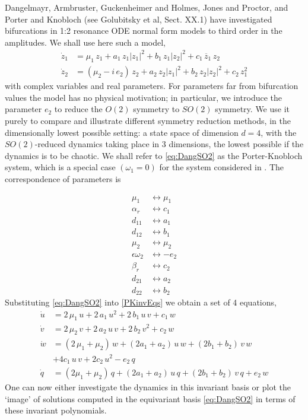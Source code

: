 \documentclass{article}
\begin{document}
Dangelmayr,\cite{Dang86} Armbruster, Guckenheimer and Holmes,\cite{AGHO288}
Jones and Proctor,\cite{JoPro87} and Porter and Knobloch\cite{PoKno05} (see
Golubitsky et al\cite{golubII}, Sect. XX.1) have investigated bifurcations
in 1:2 resonance ODE normal form models to third order in the amplitudes.
We shall use here such a model,
\begin{subequations}\label{eq:DangSO2}
\begin{align}
  \dot{z}_1 &= \mu_1\,z_1+a_1\,z_1|z_1|^2+b_1\,z_1|z_2|^2+c_1\,\overline{z}_1\,z_2\,\\
  \dot{z}_2 &= (\mu_2-i\, e_2)\,{z_2}+a_2\,z_2|z_1|^2+b_2\,z_2|z_2|^2+c_2\,z_1^2
\end{align}
\end{subequations}
with complex variables and real parameters. For parameters far from
bifurcation values the model has no physical motivation; in particular,
we introduce the parameter $e_2$ to reduce the $O(2)$ symmetry to $SO(2)$
symmetry. We use it purely to compare and illustrate different symmetry
reduction methods, in the dimensionally lowest possible setting: a state
space of dimension $d=4$, with the $SO(2)$-reduced dynamics taking place
in 3 dimensions, the lowest possible if the dynamics is to be chaotic. We
shall refer to \ref{eq:DangSO2} as the Porter-Knobloch system, which is a
special case $(\omega_1=0)$ for the system considered in \cite{PoKno05}.
The correspondence of parameters is

\begin{align}
\mu_1&\leftrightarrow\mu_1\\
\alpha_r&\leftrightarrow c_1\\
d_{11}&\leftrightarrow a_1\\
d_{12}&\leftrightarrow b_1\\
\mu_2&\leftrightarrow\mu_2\\
\epsilon\omega_2&\leftrightarrow-e_2\\
\beta_r&\leftrightarrow c_2\\
d_{21}&\leftrightarrow a_2 \\
d_{22}&\leftrightarrow b_2
\end{align}
Substituting
\ref{eq:DangSO2} into \ref{PKinvEqs} we obtain a set of 4 equations,
\begin{equation}
\begin{split}
  \dot{u} &= 2\,\mu_1\,u+2\,a_1\,u^2+2\,b_1\,u\,v+c_1\,w\\
  \dot{v} &= 2\,\mu_2\,v+2\,a_2\,u\,v+2\,b_2\,v^2+c_2\,w\\
  \dot{w} &= (2\,\mu_1+\mu_2)\,w+(2a_1+a_2)\,u\,w+(2b_1+b_2)\,v\,w\\
	&+4c_1\,u\,v + 2c_2\,u^2 - e_2\,q
\label{PKinvEqs1}\\
  \dot{q} &= (2\mu_1+\mu_2)\,q+(2a_1+a_2)\,u\,q+(2b_1+b_2)\,v\,q
             +e_2\,w
\end{split}
\end{equation}
One can now either investigate the dynamics in this invariant basis or
plot the `image'\cite{GL-Gil07b} of solutions computed in the equivariant
basis \ref{eq:DangSO2} in terms of these invariant polynomials.
\end{document}
